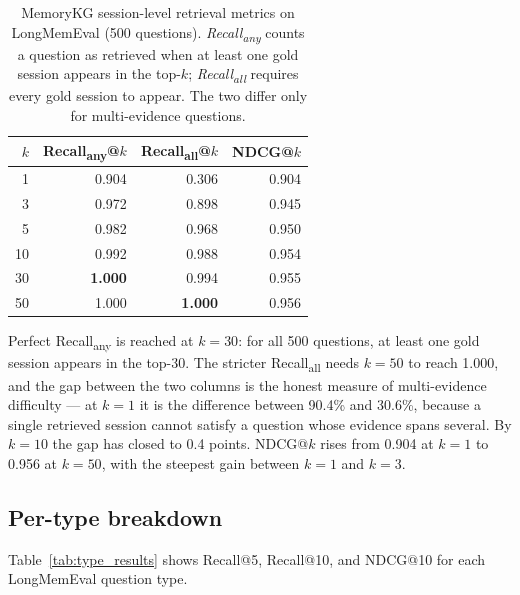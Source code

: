 \documentclass[11pt,a4paper]{article}
\begin{document}
\begin{table}[H]
\centering
\caption{MemoryKG session-level retrieval metrics on LongMemEval (500 questions).
         \emph{Recall\textsubscript{any}} counts a question as retrieved when at
         least one gold session appears in the top-$k$; \emph{Recall\textsubscript{all}}
         requires every gold session to appear. The two differ only for
         multi-evidence questions.}
\label{tab:recall_at_k}
\begin{tabular}{rrrr}
  \toprule
  \textbf{$k$} & \textbf{Recall\textsubscript{any}@$k$} & \textbf{Recall\textsubscript{all}@$k$} & \textbf{NDCG@$k$} \\
  \midrule
   1  & 0.904 & 0.306 & 0.904 \\
   3  & 0.972 & 0.898 & 0.945 \\
   5  & 0.982 & 0.968 & 0.950 \\
  10  & 0.992 & 0.988 & 0.954 \\
  30  & \textbf{1.000} & 0.994 & 0.955 \\
  50  & 1.000 & \textbf{1.000} & 0.956 \\
  \bottomrule
\end{tabular}
\end{table}

Perfect Recall\textsubscript{any} is reached at $k{=}30$: for all 500 questions,
at least one gold session appears in the top-30.
The stricter Recall\textsubscript{all} needs $k{=}50$ to reach 1.000, and the gap
between the two columns is the honest measure of multi-evidence difficulty --- at
$k{=}1$ it is the difference between 90.4\% and 30.6\%, because a single retrieved
session cannot satisfy a question whose evidence spans several.
By $k{=}10$ the gap has closed to 0.4 points.
NDCG@$k$ rises from 0.904 at $k{=}1$ to 0.956 at $k{=}50$, with the steepest gain
between $k{=}1$ and $k{=}3$.

\subsection{Per-type breakdown}

Table~\ref{tab:type_results} shows Recall@5, Recall@10, and NDCG@10 for each
LongMemEval question type.
\end{document}
